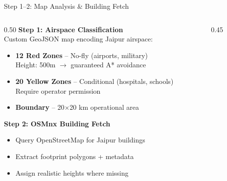 \documentclass[aspectratio=169, 11pt]{beamer}
\begin{document}
\begin{frame}{Step 1--2: Map Analysis \& Building Fetch}
\begin{columns}[T]
\begin{column}{0.50\textwidth}
\textcolor{neongreen}{\textbf{Step 1: Airspace Classification}}\\[0.2cm]
\small
Custom GeoJSON map encoding Jaipur airspace:
\begin{itemize}
    \item[\textcolor{dangerred}{$\blacksquare$}] \textbf{12 Red Zones} -- No-fly (airports, military)\\Height: 500m $\rightarrow$ guaranteed A* avoidance
    \item[\textcolor{warnorange}{$\blacksquare$}] \textbf{20 Yellow Zones} -- Conditional (hospitals, schools)\\Require operator permission
    \item[\textcolor{neongreen}{$\blacksquare$}] \textbf{Boundary} -- 20$\times$20 km operational area
\end{itemize}

\vspace{0.3cm}
\textcolor{accentblue}{\textbf{Step 2: OSMnx Building Fetch}}\\[0.2cm]
\small
\begin{itemize}
    \item Query OpenStreetMap for Jaipur buildings
    \item Extract footprint polygons + metadata
    \item Assign realistic heights where missing
\end{itemize}
\end{column}
\begin{column}{0.45\textwidth}
\end{column}
\end{columns}
\end{frame}
\end{document}
